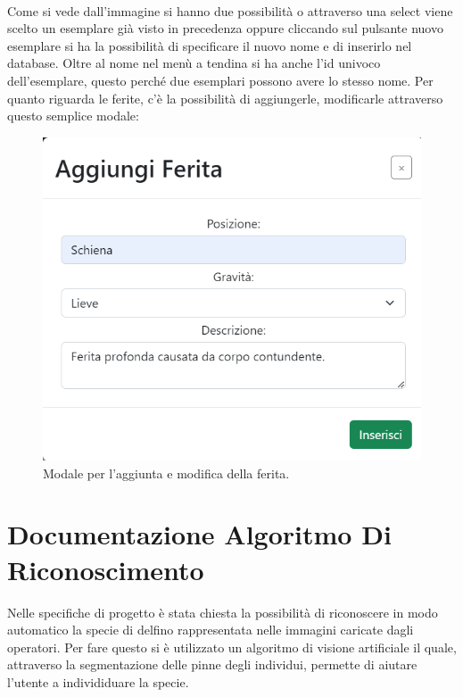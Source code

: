 \documentclass[a4paper,final,12pt]{report}
\begin{document}
\\Come si vede dall'immagine si hanno due possibilità o attraverso una select viene scelto un esemplare già visto in precedenza oppure cliccando sul pulsante nuovo esemplare si ha la possibilità di specificare il nuovo nome e di inserirlo nel database. Oltre al nome nel menù a tendina si ha anche l'id univoco dell'esemplare, questo perché due esemplari possono avere lo stesso nome. 
\newpage
Per quanto riguarda le ferite, c'è la possibilità di aggiungerle, modificarle attraverso questo semplice modale:
\begin{figure}[hbtp]
\centering
\includegraphics[scale=0.90]{img_concettuale/ferita.png}
\caption{Modale per l'aggiunta e modifica della ferita.}
\end{figure}

\chapter{Documentazione Algoritmo Di Riconoscimento}
Nelle specifiche di progetto è stata chiesta la possibilità di riconoscere in modo automatico la specie di delfino rappresentata nelle immagini caricate dagli operatori. Per fare questo si è utilizzato un algoritmo di visione artificiale il quale, attraverso la segmentazione delle pinne degli individui, permette di aiutare l'utente a individiduare la specie.
\end{document}
